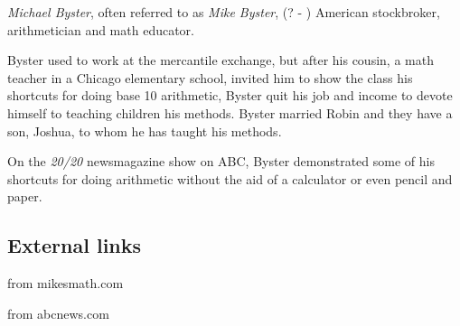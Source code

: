\documentclass[12pt]{article}
\begin{document}

\emph{Michael Byster}, often referred to as \emph{Mike Byster}, (? - ) American stockbroker, arithmetician and math educator.

Byster used to work at the mercantile exchange, but after his cousin, a math teacher in a Chicago elementary school, invited him to show the class his shortcuts for doing base 10 arithmetic, Byster quit his job and income to devote himself to teaching children his methods. Byster married Robin and they have a son, Joshua, to whom he has taught his methods.

On the {\it 20/20} newsmagazine show on ABC, Byster demonstrated some of his shortcuts for doing arithmetic without the aid of a calculator or even pencil and paper.

\subsection{External links}
 from mikesmath.com

 from abcnews.com
\end{document}
